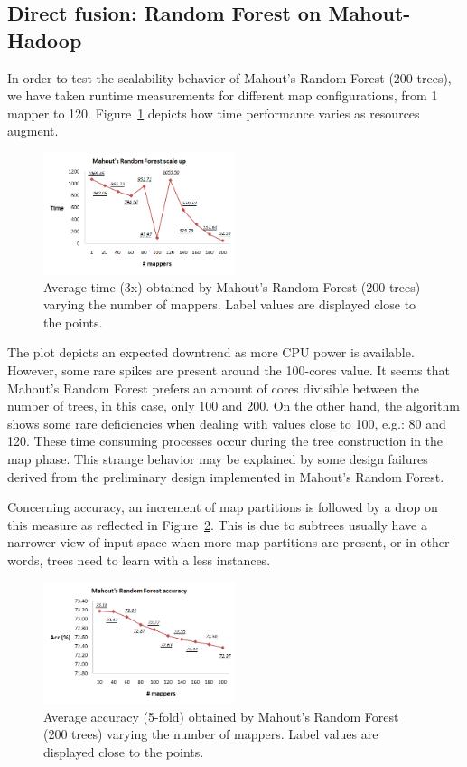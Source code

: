 \documentclass[3p,review]{elsarticle}
\begin{document}
\subsection{Direct fusion: Random Forest on Mahout-Hadoop}
\label{subsec:rfmahout}

In order to test the scalability behavior of Mahout's Random Forest (200 trees), we have taken runtime measurements for different map configurations, from 1 mapper to 120. Figure~\ref{fig:rf-mahout} depicts how time performance varies as resources augment.

\begin{figure}[!htp]
    \centering
    \includegraphics[width=0.5\textwidth]{rf-mahout}
    \caption{Average time (3x) obtained by Mahout's Random Forest (200 trees) varying the number of mappers. Label values are displayed close to the points.}
    \label{fig:rf-mahout}
\end{figure}

The plot depicts an expected downtrend as more CPU power is available. However, some rare spikes are present around the 100-cores value. It seems that Mahout's Random Forest prefers an amount of cores divisible between the number of trees, in this case, only 100 and 200. On the other hand, the algorithm shows some rare deficiencies when dealing with values close to 100, e.g.: 80 and 120. These time consuming processes occur during the tree construction in the map phase. This strange behavior may be explained by some design failures derived from the preliminary design implemented in Mahout's Random Forest.

Concerning accuracy, an increment of map partitions is followed by a drop on this measure as reflected in Figure~\ref{fig:rf-mahout-pred}. This is due to subtrees usually have a narrower view of input space when more map partitions are present, or in other words, trees need to learn with a less instances.

\begin{figure}[!htp]
    \centering
    \includegraphics[width=0.5\textwidth]{rf-mahout-acc}
    \caption{Average accuracy (5-fold) obtained by Mahout's Random Forest (200 trees) varying the number of mappers. Label values are displayed close to the points.}
    \label{fig:rf-mahout-pred}
\end{figure}
\end{document}
